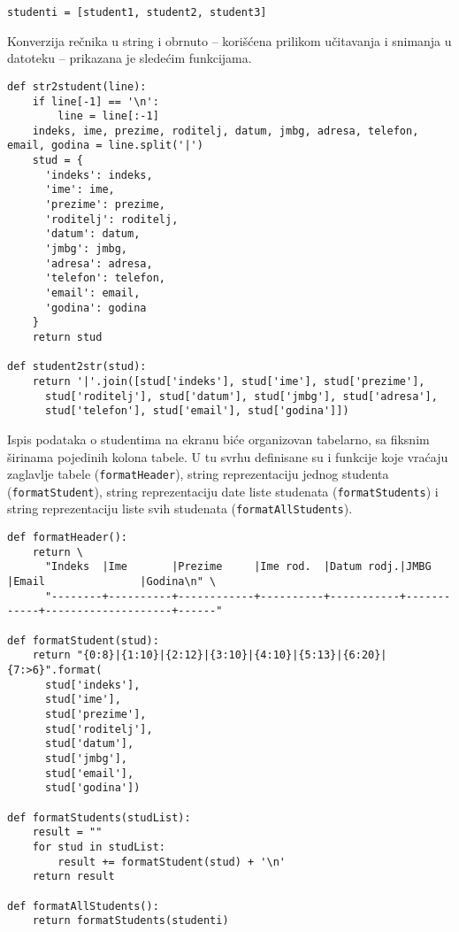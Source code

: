 \documentclass[a4paper]{article}
\begin{document}
\begin{verbatim}
studenti = [student1, student2, student3]
\end{verbatim}

Konverzija rečnika u string i obrnuto -- korišćena prilikom učitavanja i
snimanja u datoteku -- prikazana je sledećim funkcijama.

\begin{verbatim}
def str2student(line):
    if line[-1] == '\n':
        line = line[:-1]
    indeks, ime, prezime, roditelj, datum, jmbg, adresa, telefon, email, godina = line.split('|')
    stud = {
      'indeks': indeks,
      'ime': ime,
      'prezime': prezime,
      'roditelj': roditelj,
      'datum': datum,
      'jmbg': jmbg,
      'adresa': adresa,
      'telefon': telefon,
      'email': email,
      'godina': godina
    }
    return stud

def student2str(stud):
    return '|'.join([stud['indeks'], stud['ime'], stud['prezime'], 
      stud['roditelj'], stud['datum'], stud['jmbg'], stud['adresa'], 
      stud['telefon'], stud['email'], stud['godina']])
\end{verbatim}

Ispis podataka o studentima na ekranu biće organizovan tabelarno, sa fiksnim
širinama pojedinih kolona tabele. U tu svrhu definisane su i funkcije koje
vraćaju zaglavlje tabele (\texttt{formatHeader}), string reprezentaciju jednog
studenta (\texttt{formatStudent}), string reprezentaciju date liste studenata
(\texttt{formatStudents}) i string reprezentaciju liste svih studenata
(\texttt{formatAllStudents}).

\begin{verbatim}
def formatHeader():
    return \
      "Indeks  |Ime       |Prezime     |Ime rod.  |Datum rodj.|JMBG        |Email               |Godina\n" \
      "--------+----------+------------+----------+-----------+------------+--------------------+------"

def formatStudent(stud):
    return "{0:8}|{1:10}|{2:12}|{3:10}|{4:10}|{5:13}|{6:20}|{7:>6}".format(
      stud['indeks'],
      stud['ime'],
      stud['prezime'],
      stud['roditelj'],
      stud['datum'],
      stud['jmbg'],
      stud['email'],
      stud['godina'])

def formatStudents(studList):
    result = ""
    for stud in studList:
        result += formatStudent(stud) + '\n'
    return result

def formatAllStudents():
    return formatStudents(studenti)
\end{verbatim}
\end{document}
